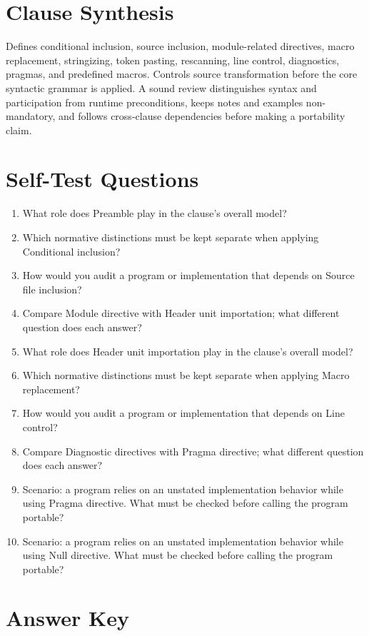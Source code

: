 \documentclass[11pt,letterpaper]{article}
\begin{document}
\section{Clause Synthesis}
\begin{CornellReferenceOrientationBox}Defines conditional inclusion, source inclusion, module-related directives, macro replacement, stringizing, token pasting, rescanning, line control, diagnostics, pragmas, and predefined macros. Controls source transformation before the core syntactic grammar is applied. A sound review distinguishes syntax and participation from runtime preconditions, keeps notes and examples non-mandatory, and follows cross-clause dependencies before making a portability claim.\end{CornellReferenceOrientationBox}
\section{Self-Test Questions}
\begin{enumerate}
\item What role does Preamble play in the clause's overall model?
\item Which normative distinctions must be kept separate when applying Conditional inclusion?
\item How would you audit a program or implementation that depends on Source file inclusion?
\item Compare Module directive with Header unit importation; what different question does each answer?
\item What role does Header unit importation play in the clause's overall model?
\item Which normative distinctions must be kept separate when applying Macro replacement?
\item How would you audit a program or implementation that depends on Line control?
\item Compare Diagnostic directives with Pragma directive; what different question does each answer?
\item Scenario: a program relies on an unstated implementation behavior while using Pragma directive. What must be checked before calling the program portable?
\item Scenario: a program relies on an unstated implementation behavior while using Null directive. What must be checked before calling the program portable?
\end{enumerate}
\clearpage\section{Answer Key}
\end{document}
